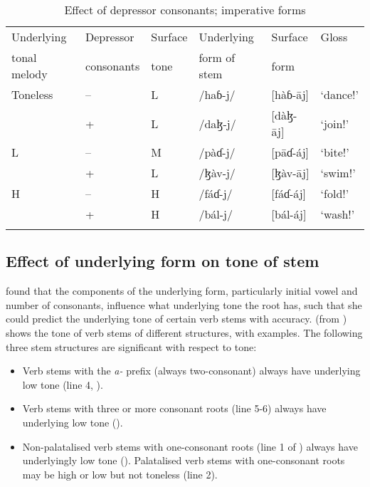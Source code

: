\begin{table}
\begin{tabular}{llllll}
\lsptoprule
{Underlying } & {Depressor} & {Surface } & {Underlying } & {Surface } & {Gloss}\\
{tonal melody} & {consonants} & {tone} & {form of stem} & {form} &\\\midrule
Toneless & -- & L & /haɓ-j/ & [hàɓ-\={a}j] & ‘dance!’\\
& + & L & /daɮ-j/ & [dàɮ-\={a}j] & ‘join!’\\\midrule
L & -- & M & /pàɗ-j/ & [p\={a}ɗ-áj] & ‘bite!’\\
& + & L & /ɮàv-j/ & [ɮàv-\={a}j] & ‘swim!’\\\midrule
H & -- & H & /fáɗ-j/ & [fáɗ-áj] & ‘fold!’\\
& + & H & /bál-j/ & [bál-áj] & ‘wash!’\\
\lspbottomrule
\end{tabular}
\caption{Effect of depressor consonants; imperative forms\label{tab:47}}
\end{table}

\subsection{  Effect of underlying form on tone of stem}\label{sec:6.7.2}
\hypertarget{RefHeading1212061525720847}{}
\largerpage \citet{Bow1997c} found that the components of the underlying form, particularly initial vowel and number of consonants, influence what underlying tone the root has, such that she could predict the underlying tone of certain verb stems with accuracy.  (from \citealt{FriesenMamalis2008}) shows the tone of verb stems of different structures, with examples. The following three stem structures are significant with respect to tone:


\begin{itemize}
\item Verb stems with the \textit{a-} prefix (always two-consonant) always have underlying low tone (line 4, ). 
\item Verb stems with three or more consonant roots (line 5-6) always have underlying low tone (). 
\item Non-palatalised verb stems with one-consonant roots (line 1 of ) always have underlyingly low tone (). Palatalised verb stems with one-consonant roots may be high or low but not toneless (line 2). 
\end{itemize}

